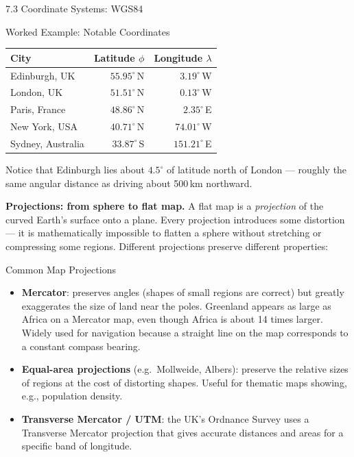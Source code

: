 \documentclass[aspectratio=169,10pt]{beamer}
\begin{document}
\begin{frame}[allowframebreaks]{7.3 Coordinate Systems: WGS84}
  \begin{exampleblock}{Worked Example: Notable Coordinates}
    \begin{tabular}{lrr}
      \toprule
      City & Latitude $\phi$ & Longitude $\lambda$ \\
      \midrule
      Edinburgh, UK   & $55.95^{\circ}$\,N & $3.19^{\circ}$\,W \\
      London, UK      & $51.51^{\circ}$\,N & $0.13^{\circ}$\,W \\
      Paris, France   & $48.86^{\circ}$\,N & $2.35^{\circ}$\,E \\
      New York, USA   & $40.71^{\circ}$\,N & $74.01^{\circ}$\,W \\
      Sydney, Australia & $33.87^{\circ}$\,S & $151.21^{\circ}$\,E \\
      \bottomrule
    \end{tabular}

    \vspace{0.4em}
    Notice that Edinburgh lies about $4.5^{\circ}$ of latitude north of
    London --- roughly the same angular distance as driving about
    500\,km northward.
  \end{exampleblock}

  \framebreak

  \textbf{Projections: from sphere to flat map.}
  A flat map is a \emph{projection} of the curved Earth's surface
  onto a plane.  Every projection introduces some distortion ---
  it is mathematically impossible to flatten a sphere without
  stretching or compressing some regions.  Different projections
  preserve different properties:

  \begin{block}{Common Map Projections}
    \begin{itemize}
      \item \textbf{Mercator}: preserves angles (shapes of small
            regions are correct) but greatly exaggerates the size of
            land near the poles.  Greenland appears as large as Africa
            on a Mercator map, even though Africa is about 14 times
            larger.  Widely used for navigation because a straight line
            on the map corresponds to a constant compass bearing.
      \item \textbf{Equal-area projections} (e.g.\ Mollweide,
            Albers): preserve the relative sizes of regions at the
            cost of distorting shapes.  Useful for thematic maps
            showing, e.g., population density.
      \item \textbf{Transverse Mercator / UTM}: the UK's Ordnance
            Survey uses a Transverse Mercator projection that gives
            accurate distances and areas for a specific band of
            longitude.
    \end{itemize}
  \end{block}


\end{frame}
\end{document}

